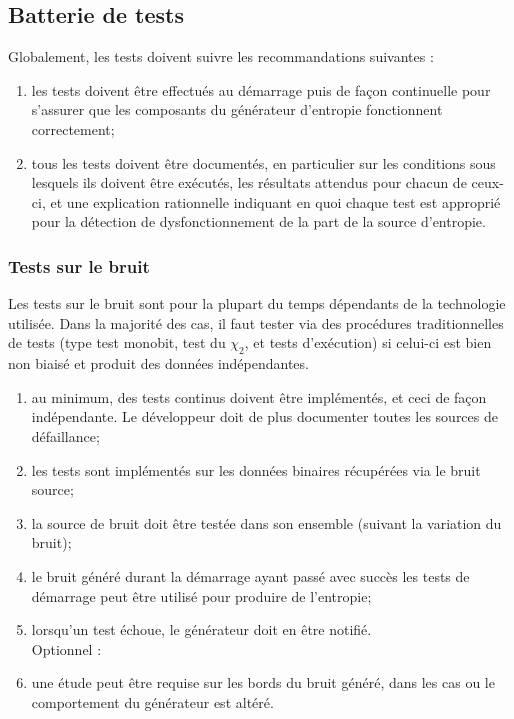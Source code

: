 \subsection{Batterie de tests}
Globalement, les tests doivent suivre les recommandations suivantes :
\begin{enumerate}
\item les tests doivent être effectués au démarrage puis de façon continuelle pour s'assurer que les composants du générateur d'entropie fonctionnent correctement;
\item tous les tests doivent être documentés, en particulier sur les conditions sous lesquels ils doivent être exécutés, les résultats attendus pour chacun de ceux-ci, et une explication rationnelle indiquant en quoi chaque test est approprié pour la détection de dysfonctionnement de la part de la source d'entropie.\\
\end{enumerate}

\subsubsection{Tests sur le bruit}
Les tests sur le bruit sont pour la plupart du temps dépendants de la technologie utilisée. Dans la majorité des cas, il faut tester via des procédures traditionnelles de tests (type test monobit, test du $\chi_2$, et tests d'exécution) si celui-ci est bien non biaisé et produit des données indépendantes.
\begin{enumerate}
\item au minimum, des tests continus doivent être implémentés, et ceci de façon indépendante. Le développeur doit de plus documenter toutes les sources de défaillance;
\item les tests sont implémentés sur les données binaires récupérées via le bruit source;
\item la source de bruit doit être testée dans son ensemble (suivant la variation du bruit);
\item le bruit généré durant la démarrage ayant passé avec succès les tests de démarrage peut être utilisé pour produire de l'entropie;
\item lorsqu'un test échoue, le générateur doit en être notifié.\\

Optionnel : 
\item une étude peut être requise sur les bords du bruit généré, dans les cas ou le comportement du générateur est altéré.
\end{enumerate}


